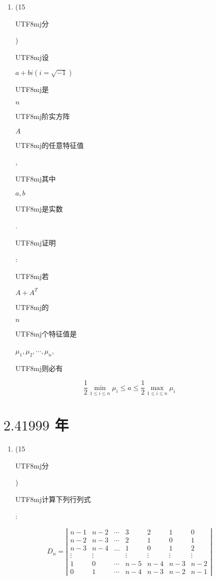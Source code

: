 \documentclass[10pt]{article}
\begin{document}
\begin{enumerate}
  \item (15 \begin{CJK}{UTF8}{mj}分\end{CJK}) \begin{CJK}{UTF8}{mj}设\end{CJK} $a+b i(i=\sqrt{-1})$ \begin{CJK}{UTF8}{mj}是\end{CJK} $n$ \begin{CJK}{UTF8}{mj}阶实方阵\end{CJK} $A$ \begin{CJK}{UTF8}{mj}的任意特征值\end{CJK}, \begin{CJK}{UTF8}{mj}其中\end{CJK} $a, b$ \begin{CJK}{UTF8}{mj}是实数\end{CJK}. \begin{CJK}{UTF8}{mj}证明\end{CJK}: \begin{CJK}{UTF8}{mj}若\end{CJK} $A+A^{T}$ \begin{CJK}{UTF8}{mj}的\end{CJK} $n$ \begin{CJK}{UTF8}{mj}个特征值是\end{CJK} $\mu_{1}, \mu_{2}, \cdots, \mu_{n}$, \begin{CJK}{UTF8}{mj}则必有\end{CJK}

\end{enumerate}
$$
\frac{1}{2} \min _{1 \leqslant i \leqslant n} \mu_{i} \leqslant a \leqslant \frac{1}{2} \max _{1 \leqslant i \leqslant n} \mu_{i}
$$

\section{$2.41999$ 年}
\begin{enumerate}
  \item (15 \begin{CJK}{UTF8}{mj}分\end{CJK}) \begin{CJK}{UTF8}{mj}计算下列行列式\end{CJK}:
\end{enumerate}
$$
D_{n}=\left|\begin{array}{ccccccc}
n-1 & n-2 & \cdots & 3 & 2 & 1 & 0 \\
n-2 & n-3 & \cdots & 2 & 1 & 0 & 1 \\
n-3 & n-4 & \ldots & 1 & 0 & 1 & 2 \\
\vdots & \vdots & & \vdots & \vdots & \vdots & \vdots \\
1 & 0 & \cdots & n-5 & n-4 & n-3 & n-2 \\
0 & 1 & \cdots & n-4 & n-3 & n-2 & n-1
\end{array}\right|
$$
\end{document}
